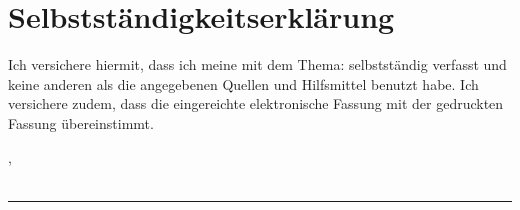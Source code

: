 
\chapter*{Selbstständigkeitserklärung}
\vspace*{2em}


Ich versichere hiermit, dass ich meine {\myArbeit} mit dem Thema: {\itshape \myTitel } selbstständig verfasst und keine anderen als die angegebenen Quellen und Hilfsmittel benutzt habe. Ich versichere zudem, dass die eingereichte elektronische Fassung mit der gedruckten Fassung übereinstimmt.


\vspace{3em}
\noindent
\myAbgabeort, \myDatum
\\
\\
\noindent
\rule{6cm}{0.4pt}\\
\myAutor
